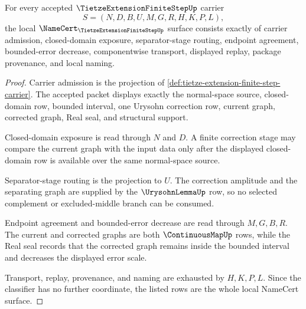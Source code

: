 \begin{theorem}
\label{thm:tietze-extension-finite-step-namecert-obligations}
For every accepted $\TietzeExtensionFiniteStepUp$ carrier
$$
S=(N,D,B,U,M,G,R,H,K,P,L),
$$
the local $\NameCert_{\TietzeExtensionFiniteStepUp}$ surface consists exactly of carrier admission, closed-domain exposure, separator-stage routing, endpoint agreement, bounded-error decrease, componentwise transport, displayed replay, package provenance, and local naming.
\end{theorem}
\begin{proof}
Carrier admission is the projection of \autoref{def:tietze-extension-finite-step-carrier}. The accepted packet displays exactly the normal-space source, closed-domain row, bounded interval, one Urysohn correction row, current graph, corrected graph, Real seal, and structural support.

Closed-domain exposure is read through $N$ and $D$. A finite correction stage may compare the current graph with the input data only after the displayed closed-domain row is available over the same normal-space source.

Separator-stage routing is the projection to $U$. The correction amplitude and the separating graph are supplied by the $\UrysohnLemmaUp$ row, so no selected complement or excluded-middle branch can be consumed.

Endpoint agreement and bounded-error decrease are read through $M,G,B,R$. The current and corrected graphs are both $\ContinuousMapUp$ rows, while the Real seal records that the corrected graph remains inside the bounded interval and decreases the displayed error scale.

Transport, replay, provenance, and naming are exhausted by $H,K,P,L$. Since the classifier has no further coordinate, the listed rows are the whole local NameCert surface.
\end{proof}

